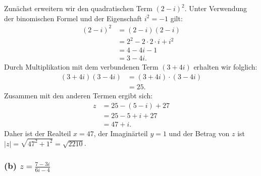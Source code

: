 \documentclass{article}
\theoremstyle{definition}
\theoremstyle{remark}
\begin{document}
Zunächst erweitern wir den quadratischen Term \((2 - i)^{2}\). Unter Verwendung der binomischen Formel und der Eigenschaft \(i^2 = -1\) gilt:
\begin{align*}
	(2 - i)^2 & = (2 - i)(2 - i)                \\
	          & = 2^2 - 2 \cdot 2 \cdot i + i^2 \\
	          & = 4 - 4i - 1                    \\
	          & = 3 - 4i.
\end{align*}
Durch Multiplikation mit dem verbundenen Term \( (3 + 4i) \) erhalten wir folglich:
\begin{align*}
	(3 + 4i)(3 - 4i) & = (3 + 4i) \cdot (3 - 4i) \\
	                 & = 25.
\end{align*}
Zusammen mit den anderen Termen ergibt sich:
\begin{align*}
	z & = 25 - (5 - i) + 27 \\
	  & = 25 - 5 + i + 27   \\
	  & = 47 + i.
\end{align*}
Daher ist der Realteil \( x = 47 \), der Imaginärteil \( y = 1 \) und der Betrag von \( z \) ist \( |z| = \sqrt{47^2 + 1^2} = \sqrt{2210} \).

\subsubsection*{(b) \( z = \frac{7 - 3i}{6i - 4} \)}
\end{document}
